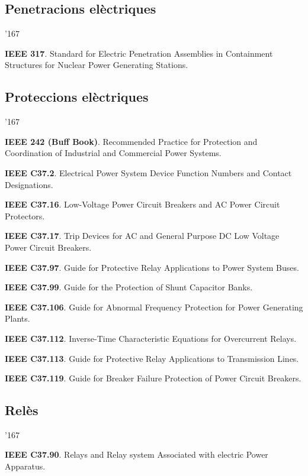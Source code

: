 \subsection*{Penetracions el\`{e}ctriques}
\begin{dinglist}{'167}
    \item \textbf{IEEE 317}. Standard for Electric Penetration Assemblies in Containment Structures for Nuclear Power Generating Stations.
\end{dinglist}


\subsection*{Proteccions el\`{e}ctriques}
\begin{dinglist}{'167}
    \item \textbf{IEEE 242 (Buff Book)}. Recommended Practice for Protection and Coordination of Industrial and Commercial Power Systems.
    \item \textbf{IEEE C37.2}. Electrical Power System Device Function Numbers and Contact Designations.
    \item \textbf{IEEE C37.16}. Low-Voltage Power Circuit Breakers and AC Power Circuit Protectors.
    \item \textbf{IEEE C37.17}. Trip Devices for AC and General Purpose DC Low Voltage Power Circuit Breakers.
    \item \textbf{IEEE C37.97}. Guide for Protective Relay Applications to Power System Buses.
    \item \textbf{IEEE C37.99}. Guide for the Protection of Shunt Capacitor Banks.
    \item \textbf{IEEE C37.106}. Guide for Abnormal Frequency Protection for Power Generating Plants.
    \item \textbf{IEEE C37.112}. Inverse-Time Characteristic Equations for Overcurrent Relays.
    \item \textbf{IEEE C37.113}. Guide for Protective Relay Applications to Transmission Lines.
    \item \textbf{IEEE C37.119}. Guide for Breaker Failure Protection of Power Circuit Breakers.
\end{dinglist}


\subsection*{Rel\`{e}s}
\begin{dinglist}{'167}
    \item \textbf{IEEE C37.90}. Relays and Relay system Associated with electric Power Apparatus.
\end{dinglist}



